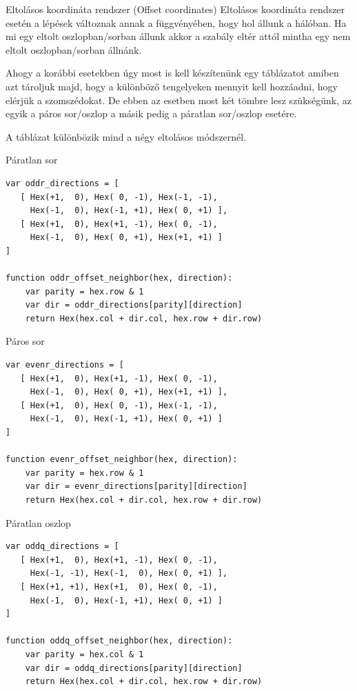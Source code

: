 Eltolásos koordináta rendszer (Offset coordinates)
Eltolásos koordináta rendszer esetén a lépések változnak annak a függvényében, hogy hol állunk a hálóban. Ha mi egy eltolt oszlopban/sorban állunk akkor a szabály eltér attól mintha egy nem eltolt oszlopban/sorban állnánk.

Ahogy a korábbi esetekben úgy most is kell készítenünk egy táblázatot amiben azt tároljuk majd, hogy a különböző tengelyeken mennyit kell hozzáadni, hogy elérjük a szomszédokat. De ebben az esetben most két tömbre lesz szükségünk, az egyik a páros sor/oszlop a másik pedig a páratlan sor/oszlop esetére.

A táblázat különbözik mind a négy eltolásos módszernél.

Páratlan sor

\begin{verbatim}
var oddr_directions = [
   [ Hex(+1,  0), Hex( 0, -1), Hex(-1, -1),
     Hex(-1,  0), Hex(-1, +1), Hex( 0, +1) ],
   [ Hex(+1,  0), Hex(+1, -1), Hex( 0, -1),
     Hex(-1,  0), Hex( 0, +1), Hex(+1, +1) ]
]

function oddr_offset_neighbor(hex, direction):
    var parity = hex.row & 1
    var dir = oddr_directions[parity][direction]
    return Hex(hex.col + dir.col, hex.row + dir.row)
\end{verbatim}

Páros sor

\begin{verbatim}
var evenr_directions = [
   [ Hex(+1,  0), Hex(+1, -1), Hex( 0, -1),
     Hex(-1,  0), Hex( 0, +1), Hex(+1, +1) ],
   [ Hex(+1,  0), Hex( 0, -1), Hex(-1, -1),
     Hex(-1,  0), Hex(-1, +1), Hex( 0, +1) ]
]

function evenr_offset_neighbor(hex, direction):
    var parity = hex.row & 1
    var dir = evenr_directions[parity][direction]
    return Hex(hex.col + dir.col, hex.row + dir.row)
\end{verbatim}

Páratlan oszlop

\begin{verbatim}
var oddq_directions = [
   [ Hex(+1,  0), Hex(+1, -1), Hex( 0, -1),
     Hex(-1, -1), Hex(-1,  0), Hex( 0, +1) ],
   [ Hex(+1, +1), Hex(+1,  0), Hex( 0, -1),
     Hex(-1,  0), Hex(-1, +1), Hex( 0, +1) ]
]

function oddq_offset_neighbor(hex, direction):
    var parity = hex.col & 1
    var dir = oddq_directions[parity][direction]
    return Hex(hex.col + dir.col, hex.row + dir.row)
\end{verbatim}


